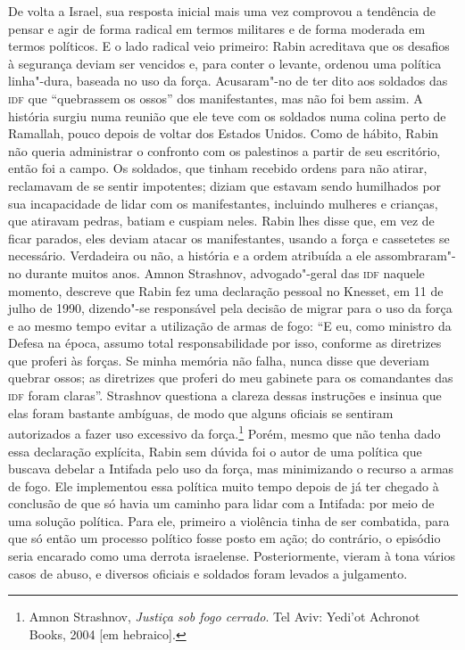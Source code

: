 De volta a Israel, sua resposta inicial mais uma vez comprovou a
tendência de pensar e agir de forma radical em termos militares e de
forma moderada em termos políticos. E o lado radical veio primeiro: Rabin
acreditava que os desafios à segurança deviam ser vencidos e, para
conter o levante, ordenou uma política linha"-dura, baseada no uso da
força. Acusaram"-no de ter dito aos soldados das \textsc{idf} que ``quebrassem os
ossos'' dos manifestantes, mas não foi bem assim. A história surgiu numa
reunião que ele teve com os soldados numa colina perto de Ramallah,
pouco depois de voltar dos Estados Unidos. Como de hábito, Rabin não
queria administrar o confronto com os palestinos a partir de seu
escritório, então foi a campo. Os soldados, que tinham recebido ordens
para não atirar, reclamavam de se sentir impotentes; diziam que estavam
sendo humilhados por sua incapacidade de lidar com os manifestantes,
incluindo mulheres e crianças, que atiravam pedras, batiam e cuspiam
neles. Rabin lhes disse que, em vez de ficar parados, eles deviam atacar os
manifestantes, usando a força e cassetetes se necessário. Verdadeira ou
não, a história e a ordem atribuída a ele assombraram"-no durante muitos
anos. Amnon Strashnov, advogado"-geral das \textsc{idf} naquele momento, descreve
que Rabin fez uma declaração pessoal no Knesset, em 11 de julho de 1990,
dizendo"-se responsável pela decisão de migrar para o uso da força e ao
mesmo tempo evitar a utilização de armas de fogo: ``E eu, como ministro
da Defesa na época, assumo total responsabilidade por isso, conforme as
diretrizes que proferi às forças. Se minha memória não falha, nunca
disse que deveriam quebrar ossos; as diretrizes que proferi do meu
gabinete para os comandantes das \textsc{idf} foram claras''. Strashnov questiona
a clareza dessas instruções e insinua que elas foram bastante ambíguas,
de modo que alguns oficiais se sentiram autorizados a fazer uso
excessivo da força.\footnote{Amnon Strashnov, \emph{Justiça sob fogo cerrado}.
  Tel Aviv: Yedi'ot Achronot Books, 2004 {[}em hebraico{]}.} Porém, mesmo
que não tenha dado essa declaração explícita, Rabin sem dúvida foi o
autor de uma política que buscava debelar a Intifada pelo uso da força,
mas minimizando o recurso a armas de fogo. Ele implementou
essa política muito tempo depois de já ter chegado à conclusão de que só
havia um caminho para lidar com a Intifada: por meio de uma solução
política. Para ele, primeiro a violência tinha de ser combatida, para
que só então um processo político fosse posto em ação; do contrário, o
episódio seria encarado como uma derrota israelense. Posteriormente,
vieram à tona vários casos de abuso, e diversos oficiais e soldados
foram levados a julgamento.

